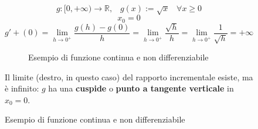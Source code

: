 \documentclass[a4paper]{article}
\theoremstyle{break}
\theoremstyle{break}
\theoremstyle{break}
\theoremstyle{break}
\begin{document}
\begin{figure}[H]
	\begin{example}
		\[
			g: [0,+\infty) \to \mathbb{R},\;\;\; g(x):= \sqrt{x}\;\;\; \forall x \ge 0
		\]
		\[
			x_0=0
		\]
		\[
			g'+(0)= \lim_{h \to 0^+} \frac{g(h)-g(0)}{h} = \lim_{h \to 0^+} \frac{\sqrt{h}}{h} = \lim_{h \to 0^+} \frac{1}{\sqrt{h} }  = +\infty
		\]
 		\begin{figure}[H]
			\begin{center}
			\end{center}
      \caption{Esempio di funzione continua e non differenziabile}
		\end{figure}

		Il limite (destro, in questo caso) del rapporto incrementale esiste, ma è infinito: \( g \)
		ha una \textbf{cuspide} o \textbf{punto a tangente verticale} in \( x_0=0 \).
	\end{example}
\end{figure}
\end{document}
